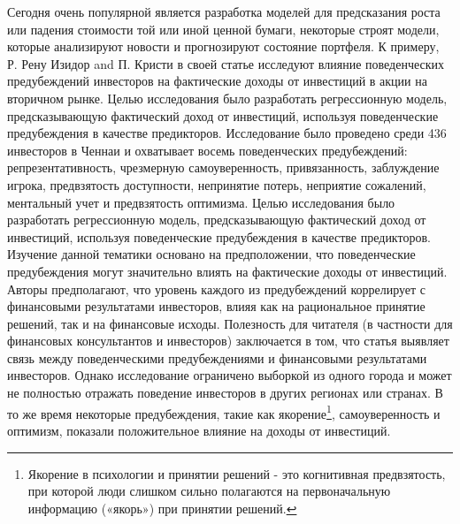 \documentclass[14pt]{extarticle}
\begin{document}
Сегодня очень популярной является разработка моделей для предсказания роста или падения стоимости той или иной ценной бумаги, некоторые строят модели, которые анализируют новости и прогнозируют состояние портфеля. К примеру, Р. Рену Изидор and П. Кристи\cite{7024cc3b-10df-38e0-a92c-a238844fe85c} в своей статье исследуют влияние поведенческих предубеждений инвесторов на фактические доходы от инвестиций в акции на вторичном рынке. Целью исследования было разработать регрессионную модель, предсказывающую фактический доход от инвестиций, используя поведенческие предубеждения в качестве предикторов. Исследование было проведено среди 436 инвесторов в Ченнаи и охватывает восемь поведенческих предубеждений: репрезентативность, чрезмерную самоуверенность,
привязанность, заблуждение игрока, предвзятость доступности, непринятие потерь, неприятие сожалений, ментальный учет и предвзятость оптимизма. Целью исследования было разработать регрессионную модель, предсказывающую фактический доход от инвестиций, используя поведенческие предубеждения в качестве предикторов. Изучение данной тематики основано на предположении, что поведенческие предубеждения могут значительно влиять на фактические доходы от инвестиций. Авторы предполагают, что уровень каждого из предубеждений коррелирует с финансовыми результатами инвесторов, влияя как на рациональное принятие решений, так и на финансовые исходы.
Полезность для читателя (в частности для финансовых консультантов и инвесторов) заключается в том, что статья выявляет связь между поведенческими предубеждениями и финансовыми результатами инвесторов. Однако исследование ограничено выборкой из одного города и может не полностью отражать поведение инвесторов в других регионах или странах. В то же время некоторые предубеждения, такие как якорение\footnote{Якорение в психологии и принятии решений - это когнитивная предвзятость, при которой люди слишком сильно полагаются на первоначальную информацию («якорь») при принятии решений.}, самоуверенность и оптимизм, показали положительное влияние на доходы от инвестиций. 
\end{document}
